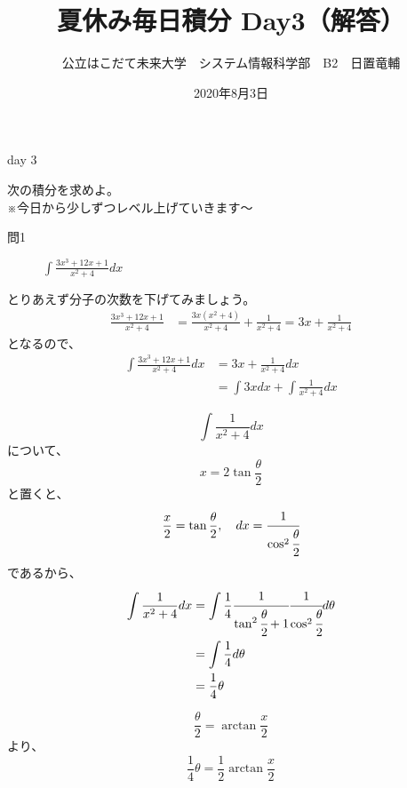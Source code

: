 \documentclass[dvipdfmx,uplatex]{jsarticle}
\title{夏休み毎日積分 Day3（解答）}
\author{公立はこだて未来大学　システム情報科学部　B2　日置竜輔}
\date{2020年8月3日}
\begin{document}
\maketitle

\begin{itembox}[c]{day 3 }
    \begin{center}
        次の積分を求めよ。\\
        ※今日から少しずつレベル上げていきます〜
    \end{center}
\end{itembox}
\begin{description}
    \item [問1] $ \displaystyle \int \frac{3x^3+12x+1}{x^2+4} dx $
\end{description}

とりあえず分子の次数を下げてみましょう。\\
\begin{align*}
  \frac{3x ^ 3 + 12x + 1}{x ^ 2 + 4}
  &=\frac{3x(x ^ 2 + 4)}{x ^ 2 + 4} + \frac{1}{x ^ 2 + 4} = 3x + \frac{1}{x ^ 2 + 4}
  \end{align*}
となるので、
\begin{align*}
    \int \frac{3x ^ 3 + 12x + 1}{x ^ 2 + 4} dx
    &= 3x + \frac{1}{x ^ 2 + 4} dx \\
    &= \int{3x}dx + \int\frac{1}{x ^ 2 + 4} dx
\end{align*}

\begin{equation*}
    \int \frac{1}{x ^ 2 + 4} dx
\end{equation*}
について、
\begin{equation*}
  x = 2 \tan \frac{\theta}{2}
\end{equation*}
と置くと、
\begin{equation*}
    \frac{x}{2}= \tan \frac{\theta}{2}, \quad dx = \cfrac{1}{\cos ^ 2\cfrac{\theta}{2}}
\end{equation*}
であるから、
\begin{align*}
    \int\frac{1}{x ^ 2 + 4}dx
    &=\int \frac{1}{4}\cfrac{1}{\tan ^ 2\cfrac{\theta}{2}+1}\cfrac{1}{\cos ^ 2\cfrac{\theta}{2}} d\theta \\
    &= \int \frac{1}{4}d\theta\\
    &= \frac{1}{4}\theta
\end{align*}

\begin{equation*}
\frac{\theta}{2} = \arctan\frac{x}{2}
\end{equation*}
より、
\begin{equation*}
\frac{1}{4}\theta = \frac{1}{2}\arctan\frac{x}{2}
\end{equation*}
\end{document}

